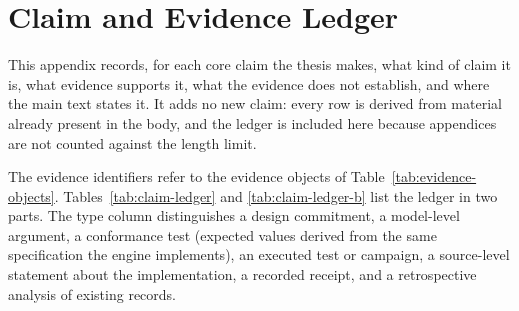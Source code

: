 \chapter{Claim and Evidence Ledger}
\label{app:claims}

This appendix records, for each core claim the thesis makes, what kind of claim it
is, what evidence supports it, what the evidence does not establish, and where the
main text states it. It adds no new claim: every row is derived from material
already present in the body, and the ledger is included here because appendices are
not counted against the length limit.

The evidence identifiers refer to the evidence objects of
Table~\ref{tab:evidence-objects}. Tables~\ref{tab:claim-ledger} and
\ref{tab:claim-ledger-b} list the ledger in two parts. The type column distinguishes a design
commitment, a model-level argument, a conformance test (expected values derived
from the same specification the engine implements), an executed test or campaign,
a source-level statement about the implementation, a recorded receipt, and a
retrospective analysis of existing records.

